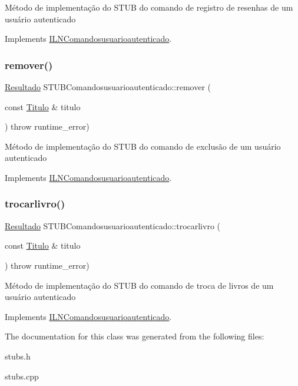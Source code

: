 Método de implementação do S\+T\+UB do comando de registro de resenhas de um usuário autenticado 

Implements \hyperlink{classILNComandosusuarioautenticado}{I\+L\+N\+Comandosusuarioautenticado}.

\mbox{\label{classSTUBComandosusuarioautenticado_a80c1a29ca48ebb60f6ba0d417946d595}} 
\subsubsection{\texorpdfstring{remover()}{remover()}}
{\footnotesize\ttfamily \hyperlink{classResultado}{Resultado} S\+T\+U\+B\+Comandosusuarioautenticado\+::remover (\begin{DoxyParamCaption}\item[{const \hyperlink{classTitulo}{Titulo} \&}]{titulo }\end{DoxyParamCaption}) throw  runtime\+\_\+error) \hspace{0.3cm}{\ttfamily [virtual]}}

Método de implementação do S\+T\+UB do comando de exclusão de um usuário autenticado 

Implements \hyperlink{classILNComandosusuarioautenticado}{I\+L\+N\+Comandosusuarioautenticado}.

\mbox{\label{classSTUBComandosusuarioautenticado_a435e243be205e8898efb085ff40aedc2}} 
\subsubsection{\texorpdfstring{trocarlivro()}{trocarlivro()}}
{\footnotesize\ttfamily \hyperlink{classResultado}{Resultado} S\+T\+U\+B\+Comandosusuarioautenticado\+::trocarlivro (\begin{DoxyParamCaption}\item[{const \hyperlink{classTitulo}{Titulo} \&}]{titulo }\end{DoxyParamCaption}) throw  runtime\+\_\+error) \hspace{0.3cm}{\ttfamily [virtual]}}

Método de implementação do S\+T\+UB do comando de troca de livros de um usuário autenticado 

Implements \hyperlink{classILNComandosusuarioautenticado}{I\+L\+N\+Comandosusuarioautenticado}.



The documentation for this class was generated from the following files\+:\begin{DoxyCompactItemize}
\item 
stubs.\+h\item 
stubs.\+cpp\end{DoxyCompactItemize}
